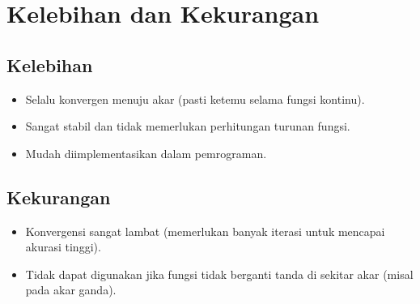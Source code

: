 \documentclass[12pt,a4paper]{article}
\begin{document}
\section{Kelebihan dan Kekurangan}
\subsection{Kelebihan}
\begin{itemize}
  \item Selalu konvergen menuju akar (pasti ketemu selama fungsi kontinu).
  \item Sangat stabil dan tidak memerlukan perhitungan turunan fungsi.
  \item Mudah diimplementasikan dalam pemrograman.
\end{itemize}

\subsection{Kekurangan}
\begin{itemize}
  \item Konvergensi sangat lambat (memerlukan banyak iterasi untuk mencapai akurasi tinggi).
  \item Tidak dapat digunakan jika fungsi tidak berganti tanda di sekitar akar (misal pada akar ganda).
\end{itemize}
\end{document}

